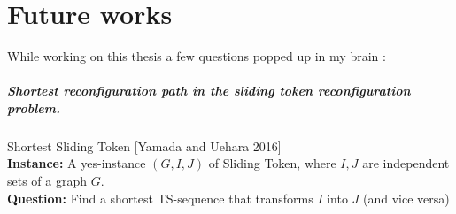 \chapter{Future works}

While working on this thesis a few questions popped up in my brain :
\paragraph{Shortest reconfiguration path in the sliding token reconfiguration problem.}
\begin{flushleft}
    Shortest Sliding Token [Yamada and Uehara 2016]\\
    \textbf{Instance: } A yes-instance $(G, I, J)$ of Sliding Token, where $I, J$ are independent sets of a graph $G$. \\
    \textbf{Question: } Find a shortest TS-sequence that transforms $I$ into $J$ (and vice versa) \\
\end{flushleft}

